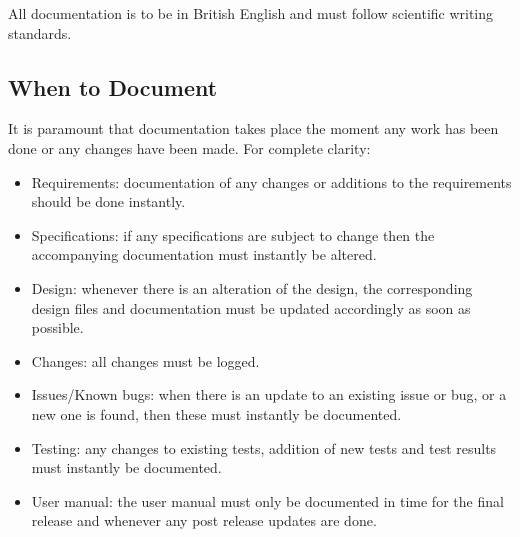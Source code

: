 All documentation is to be in British English and must follow scientific writing standards.



\subsection{When to Document}

It is paramount that documentation takes place the moment any work has been done or any changes have been made. For complete clarity:
\begin{itemize}
    \item Requirements: documentation of any changes or additions to the requirements should be done instantly.
    \item Specifications: if any specifications are subject to change then the accompanying documentation must instantly be altered.
    \item Design: whenever there is an alteration of the design, the corresponding design files and documentation must be updated accordingly as soon as possible.
    \item Changes: all changes must be logged.
    \item Issues/Known bugs: when there is an update to an existing issue or bug, or a new one is found, then these must instantly be documented.
    \item Testing: any changes to existing tests, addition of new tests and test results must instantly be documented.
    \item User manual: the user manual must only be documented in time for the final release and whenever any post release updates are done.
\end{itemize}



